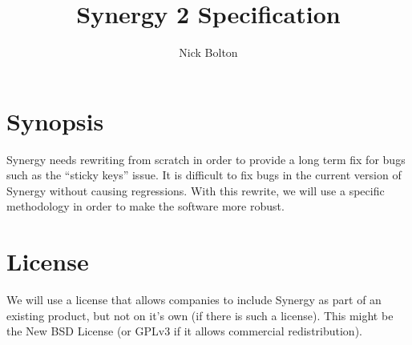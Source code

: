\documentclass{article}
\title{Synergy 2 Specification}
\author{Nick Bolton}
\begin{document}
\maketitle

\section{Synopsis}

Synergy needs rewriting from scratch in order to provide a long term fix for 
bugs such as the ``sticky keys'' issue. It is difficult to fix bugs in the
current version of Synergy without causing regressions. With this rewrite, we
will use a specific methodology in order to make the software more robust.

\section{License}

We will use a license that allows companies to include Synergy as part of an 
existing product, but not on it's own (if there is such a license). This might
be the New BSD License (or GPLv3 if it allows commercial redistribution).






\appendix

\end{document}
